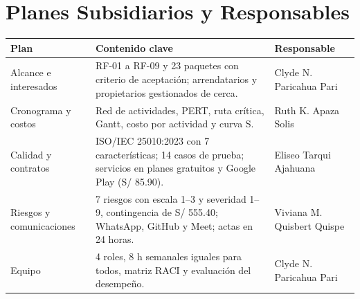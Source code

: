 \documentclass[11pt,a4paper]{article}
\begin{document}
\section{Planes Subsidiarios y Responsables}
{\small
{}
\noindent\begin{tabularx}{\textwidth}{@{}P{2.3cm} L P{3.3cm}@{}}
\toprule
{}
\textbf{Plan} & \textbf{Contenido clave} & \textbf{Responsable} \\
\midrule
Alcance e interesados & RF-01 a RF-09 y 23 paquetes con criterio de aceptación; arrendatarios y propietarios gestionados de cerca. & Clyde N. Paricahua Pari \\
Cronograma y costos & Red de actividades, PERT, ruta crítica, Gantt, costo por actividad y curva S. & Ruth K. Apaza Solis \\
Calidad y contratos & ISO/IEC 25010:2023 con 7 características; 14 casos de prueba; servicios en planes gratuitos y Google Play (S/ 85.90). & Eliseo Tarqui Ajahuana \\
Riesgos y comunicaciones & 7 riesgos con escala 1--3 y severidad 1--9, contingencia de S/ 555.40; WhatsApp, GitHub y Meet; actas en 24 horas. & Viviana M. Quisbert Quispe \\
Equipo & 4 roles, 8 h semanales iguales para todos, matriz RACI y evaluación del desempeño. & Clyde N. Paricahua Pari \\
\bottomrule
\end{tabularx}
}

\end{document}
